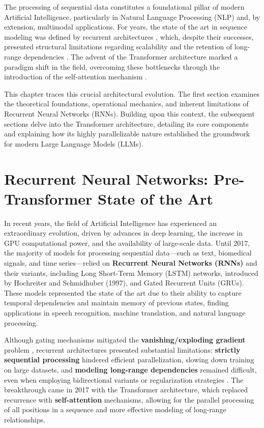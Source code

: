 The processing of sequential data constitutes a foundational pillar of modern Artificial Intelligence, particularly in Natural Language Processing (NLP) and, by extension, multimodal applications. For years, the state of the art in sequence modeling was defined by recurrent architectures \cite{rnn_sequence}, which, despite their successes, presented structural limitations regarding scalability and the retention of long-range dependencies \cite{analyticsvidhya}. The advent of the Transformer architecture marked a paradigm shift in the field, overcoming these bottlenecks through the introduction of the self-attention mechanism \cite{arxiv-attention}.\par
This chapter traces this crucial architectural evolution. The first section examines the theoretical foundations, operational mechanics, and inherent limitations of Recurrent Neural Networks (RNNs). Building upon this context, the subsequent sections delve into the Transformer architecture, detailing its core components and explaining how its highly parallelizable nature established the groundwork for modern Large Language Models (LLMs).

\section{Recurrent Neural Networks: Pre-Transformer State of the Art}
\label{chap:rnn}
\noindent
In recent years, the field of Artificial Intelligence has experienced an extraordinary evolution, driven by advances in deep learning, the increase in GPU computational power, and the availability of large-scale data. Until 2017, the majority of models for processing sequential data—such as text, biomedical signals, and time series—relied on \textbf{Recurrent Neural Networks (RNNs)} \cite{rnn_sequence, cs231n-rnn, quarkml-rnn-explained} and their variants, including Long Short-Term Memory (LSTM) networks, introduced by Hochreiter and Schmidhuber (1997), and Gated Recurrent Units (GRUs). These models represented the state of the art due to their ability to capture temporal dependencies and maintain memory of previous states, finding applications in speech recognition, machine translation, and natural language processing.

Although gating mechanisms mitigated the \textbf{vanishing/exploding gradient} problem \cite{quarkml-bptt}, recurrent architectures presented substantial limitations: \textbf{strictly sequential processing} hindered efficient parallelization, slowing down training on large datasets, and \textbf{modeling long-range dependencies} remained difficult, even when employing bidirectional variants or regularization strategies \cite{analyticsvidhya}. The breakthrough came in 2017 with the Transformer architecture, which replaced recurrence with \textbf{self-attention} mechanisms, allowing for the parallel processing of all positions in a sequence and more effective modeling of long-range relationships.

